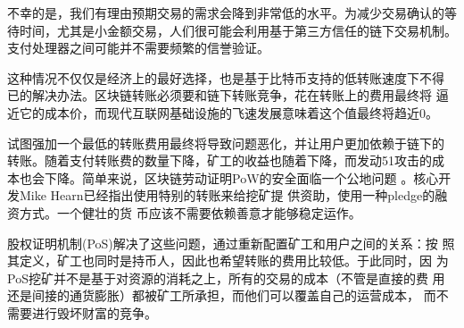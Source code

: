 \documentclass[letterpaper]{article}
\begin{document}
不幸的是，我们有理由预期交易的需求会降到非常低的水平。为减少交易确认的等待时间，尤其是小金额交易，人们很可能会利用基于第三方信任的链下交易机制。
支付处理器之间可能并不需要频繁的信誉验证。

这种情况不仅仅是经济上的最好选择，也是基于比特币支持的低转账速度下不得
已的解决办法。区块链转账必须要和链下转账竞争，花在转账上的费用最终将
逼近它的成本价，而现代互联网基础设施的飞速发展意味着这个值最终将趋近0。

试图强加一个最低的转账费用最终将导致问题恶化，并让用户更加依赖于链下的
转账。随着支付转账费的数量下降，矿工的收益也随着下降，而发动51攻击的成
本也会下降。简单来说，区块链劳动证明PoW的安全面临一个公地问题
\cite{btccommons}。核心开发Mike Hearn已经指出使用特别的转账来给挖矿提
供资助，使用一种pledge的融资方式\cite{dominantassurance}。一个健壮的货
币应该不需要依赖善意才能够稳定运作。

股权证明机制(PoS)解决了这些问题，通过重新配置矿工和用户之间的关系：按
照其定义，矿工也同时是持币人，因此也希望转账的费用比较低。于此同时，因
为PoS挖矿并不是基于对资源的消耗之上，所有的交易的成本（不管是直接的费
  用还是间接的通货膨胀）都被矿工所承担，而他们可以覆盖自己的运营成本，
而不需要进行毁坏财富的竞争。
\end{document}
